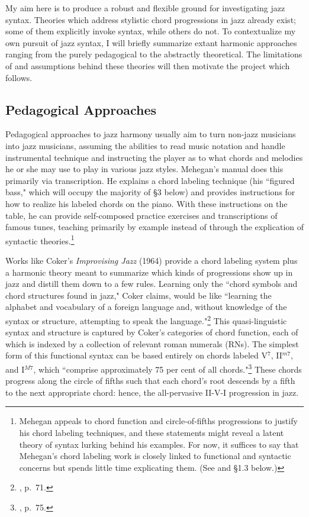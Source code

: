 My aim here is to produce a robust and flexible ground for investigating jazz syntax.  Theories which address stylistic chord progressions in jazz already exist; some of them explicitly invoke syntax, while others do not.  To contextualize my own pursuit of jazz syntax, I will briefly summarize extant harmonic approaches ranging from the purely pedagogical to the abstractly theoretical.  The limitations of and assumptions behind these theories will then motivate the project which follows.

\subsection{Pedagogical Approaches}
Pedagogical approaches to jazz harmony usually aim to turn non-jazz musicians into jazz musicians, assuming the abilities to read music notation and handle instrumental technique and instructing the player as to what chords and melodies he or she may use to play in various jazz styles.  Mehegan's manual does this primarily via transcription.  He explains a chord labeling technique (his ``figured bass," which will occupy the majority of \S 3 below) and provides instructions for how to realize his labeled chords on the piano.  With these instructions on the table, he can provide self-composed practice exercises and transcriptions of famous tunes, teaching primarily by example instead of through the explication of syntactic theories.\footnote{Mehegan appeals to chord function and circle-of-fifths progressions to justify his chord labeling techniques, and these statements might reveal a latent theory of syntax lurking behind his examples.  For now, it suffices to say that Mehegan's chord labeling work is closely linked to functional and syntactic concerns but spends little time explicating them.  (See \cite{mehegan1959} and \S 1.3 below.)}

Works like Coker's \emph{Improvising Jazz} (1964) provide a chord labeling system plus a harmonic theory meant to summarize which kinds of progressions show up in jazz and distill them down to a few rules.  Learning only the ``chord symbols and chord structures found in jazz," Coker claims, would be like ``learning the alphabet and vocabulary of a foreign language and, without knowledge of the syntax or structure, attempting to speak the language."\footnote{\cite{coker1964}, p.\ 71.}  This quasi-linguistic syntax and structure is captured by Coker's categories of chord function, each of which is indexed by a collection of relevant roman numerals (RNs).  The simplest form of this functional syntax can be based entirely on chords labeled V$^{7}$, II$^{m7}$, and I$^{M7}$, which ``comprise approximately 75 per cent of all chords."\footnote{\cite{coker1964}, p.\ 75.}  These chords progress along the circle of fifths such that each chord's root descends by a fifth to the next appropriate chord: hence, the all-pervasive II-V-I progression in jazz.

